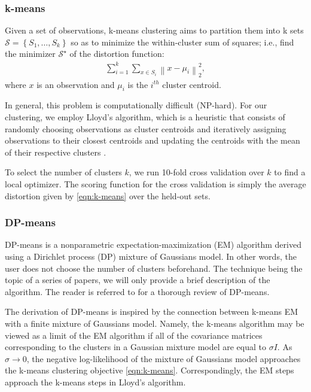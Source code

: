 \documentclass[letterpaper,10 pt,conference]{ieeeconf}
\begin{document}
\subsubsection{k-means}

Given a set of observations, k-means clustering aims to partition them into k sets $\mathcal{S} = \left\{ S_{1},\ldots,S_{k} \right\}$ so as to minimize the within-cluster sum of squares; i.e., find the minimizer $\mathcal{S}^{\star}$ of the distortion function:
\begin{align}
  \sum_{i=1}^{k}\sum_{x \in S_{i}}\left\| x - \mu_{i} \right\|_{2}^{2},
  \label{eqn:k-means}
\end{align}
where $x$ is an observation and $\mu_{i}$ is the $i^{th}$ cluster centroid.

In general, this problem is computationally difficult (NP-hard). For our clustering, we employ Lloyd's algorithm, which is a heuristic that consists of randomly choosing observations as cluster centroids and iteratively assigning observations to their closest centroids and updating the centroids with the mean of their respective clusters \cite{Ng:14}. 

To select the number of clusters $k$, we run 10-fold cross validation over $k$ to find a local optimizer. The scoring function for the cross validation is simply the average distortion given by \eqref{eqn:k-means} over the held-out sets. 

\subsubsection{DP-means}

DP-means is a nonparametric expectation-maximization (EM) algorithm derived using a Dirichlet process (DP) mixture of Gaussians model. In other words, the user does not choose the number of clusters beforehand. The technique being the topic of a series of papers, we will only provide a brief description of the algorithm. The reader is referred to \cite{TKJ:13,KJ:12} for a thorough review of DP-means. 

The derivation of DP-means is inspired by the connection between k-means EM with a finite mixture of Gaussians model. Namely, the k-means algorithm may be viewed as a limit of the EM algorithm if all of the covariance matrices corresponding to the clusters in a Gaussian mixture model are equal to $\sigma I$. As $\sigma \rightarrow 0$, the negative log-likelihood of the mixture of Gaussians model approaches the k-means clustering objective \eqref{eqn:k-means}. Correspondingly, the EM steps approach the k-means steps in Lloyd's algorithm. 
\end{document}
